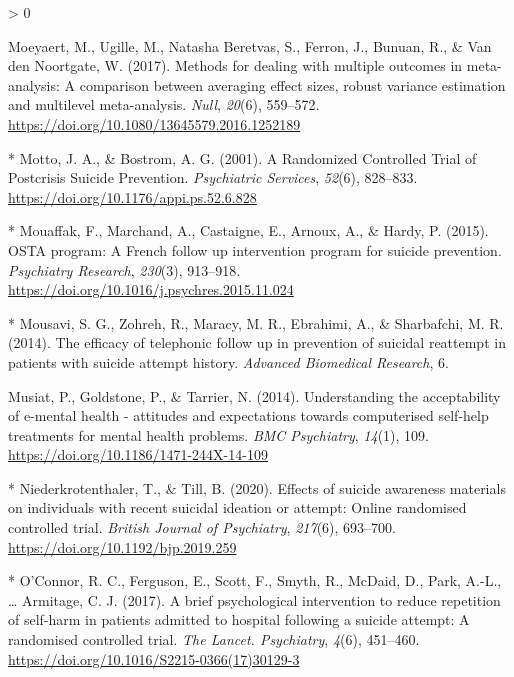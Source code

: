 \documentclass[
  english,
  man]{apa6}
\newlength{\cslhangindent}
\newenvironment{CSLReferences}[2] %
 {%
  \setlength{\parindent}{0pt}
  \ifodd #1 \everypar{\setlength{\hangindent}{\cslhangindent}}\ignorespaces\fi
  \ifnum #2 > 0
  \setlength{\parskip}{#2\baselineskip}
  \fi
 }%
 {}
\begin{document}
\begin{CSLReferences}{1}{0}
\leavevmode\hypertarget{ref-moeyaert2017}{}%
Moeyaert, M., Ugille, M., Natasha Beretvas, S., Ferron, J., Bunuan, R., \& Van den Noortgate, W. (2017). Methods for dealing with multiple outcomes in meta-analysis: A comparison between averaging effect sizes, robust variance estimation and multilevel meta-analysis. \emph{Null}, \emph{20}(6), 559--572. \url{https://doi.org/10.1080/13645579.2016.1252189}

\leavevmode\hypertarget{ref-motto2001}{}%
* Motto, J. A., \& Bostrom, A. G. (2001). A {Randomized Controlled Trial} of {Postcrisis Suicide Prevention}. \emph{Psychiatric Services}, \emph{52}(6), 828--833. \url{https://doi.org/10.1176/appi.ps.52.6.828}

\leavevmode\hypertarget{ref-mouaffak2015}{}%
* Mouaffak, F., Marchand, A., Castaigne, E., Arnoux, A., \& Hardy, P. (2015). {OSTA} program: A {French} follow up intervention program for suicide prevention. \emph{Psychiatry Research}, \emph{230}(3), 913--918. \url{https://doi.org/10.1016/j.psychres.2015.11.024}

\leavevmode\hypertarget{ref-mousavi2014}{}%
* Mousavi, S. G., Zohreh, R., Maracy, M. R., Ebrahimi, A., \& Sharbafchi, M. R. (2014). The efficacy of telephonic follow up in prevention of suicidal reattempt in patients with suicide attempt history. \emph{Advanced Biomedical Research}, 6.

\leavevmode\hypertarget{ref-musiat2014}{}%
Musiat, P., Goldstone, P., \& Tarrier, N. (2014). Understanding the acceptability of e-mental health - attitudes and expectations towards computerised self-help treatments for mental health problems. \emph{BMC Psychiatry}, \emph{14}(1), 109. \url{https://doi.org/10.1186/1471-244X-14-109}

\leavevmode\hypertarget{ref-niederkrotenthaler2020}{}%
* Niederkrotenthaler, T., \& Till, B. (2020). Effects of suicide awareness materials on individuals with recent suicidal ideation or attempt: Online randomised controlled trial. \emph{British Journal of Psychiatry}, \emph{217}(6), 693--700. \url{https://doi.org/10.1192/bjp.2019.259}

\leavevmode\hypertarget{ref-oconnor2017}{}%
* O'Connor, R. C., Ferguson, E., Scott, F., Smyth, R., McDaid, D., Park, A.-L., \ldots{} Armitage, C. J. (2017). A brief psychological intervention to reduce repetition of self-harm in patients admitted to hospital following a suicide attempt: A randomised controlled trial. \emph{The Lancet. Psychiatry}, \emph{4}(6), 451--460. \url{https://doi.org/10.1016/S2215-0366(17)30129-3}


\end{CSLReferences}
\end{document}
